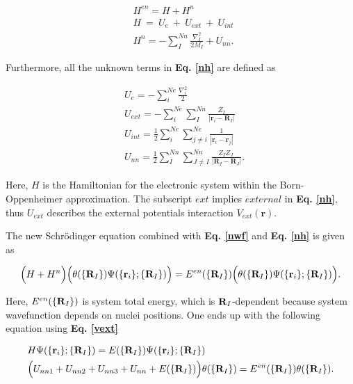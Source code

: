\documentclass[a4paper, 12pt, titlepage,oneside,drop]{kthesis}
\begin{document}
\begin{equation}\begin{split}\label{nh}
& {H^{en}} = H + H^n \\
& {H}\ = \ {U_e} \ + \ {U}_{ext} \ + \ {U}_{int}\  \\
& {H^n} = - \sum\limits_I^{Nn} \frac{{{\nabla}_{{I}}^{2}}}{2 M_{I}} + {{U}_{nn}}.
 \end{split}
\end{equation}

Furthermore, all the unknown terms in \textbf{Eq. \ref{nh}} are defined as

\begin{equation}\begin{split}\label{vext}
& {U_e} = - \sum\limits_i^{{Ne}}   \frac{{{\nabla}_{{i}}^{2}}}{2} \\
& U_{ext} = - \sum\limits_i^{{Ne}} \sum\limits_I^{{Nn}} \frac{Z_{I}}{|\textbf{r}_{i}-\textbf{R}_{I}|} \\
& {U}_{int} =  \frac{1}{2} \sum\limits_i^{{Ne}} \sum\limits_{j \neq i}^{{Ne}} \frac{1}{ |\textbf{r}_{i}-\textbf{r}_{j}|} \\
& {{U}_{nn}} = \frac{1}{2} \sum\limits_I^{{Nn}} \sum\limits_{J \neq I}^{{Nn}} \frac{Z_{I} Z_{J}\ }{|\textbf{R}_{I}-\textbf{R}_{J}|}.
\end{split}
\end{equation}

Here, $H$ is the Hamiltonian for the electronic system within the Born-Oppenheimer approximation. The subscript $ext$ implies $external$ in \textbf{Eq. \ref{nh}}, thus $U_{ext}$ describes
the external potentials interaction $V_{ext}({\textbf{r}})$. 

The new Schrödinger equation combined with \textbf{Eq. \ref{nwf}} and \textbf{Eq. \ref{nh}} is given as

\begin{equation}
 \Big( H+ {H}^n \Big) \Big({\theta(\{{\textbf R}_{I}\})} {\Psi(\{\textbf{r}_{i}\}; \{{\textbf R}_{I}\})} \Big) =
 E^{en}(\{{\textbf R_I}\}) \Big({\theta(\{{\textbf R}_{I}\})} {\Psi(\{\textbf{r}_{i}\}; \{{\textbf R}_{I}\})}\Big).
\end{equation}
 
\noindent Here, $E^{en}(\{{\textbf R }_I\})$ is system total energy, which is ${\textbf R}_I$-dependent because system wavefunction depends on nuclei positions. One ends up with the following equation using \textbf{Eq. \ref{vext}}

\begin{equation}\begin{split}\label{ise}
& {H} {\Psi(\{\textbf{r}_{ i}\}; \{{\textbf R}_{ I}\})} = E{(\{\textbf{R}_{ I}\})} {\Psi(\{\textbf{r}_{i}\}; \{{\textbf R}_{I}\})} \\
& \Big( {U}_{nn1}+{U}_{nn2}+{U}_{nn3}+{U}_{nn}+E(\{{\textbf R}_{I}\}) \Big) {\theta(\{\textbf{R}_{I}\})} = E^{en}(\{{\textbf R}_I\}) {\theta(\{\textbf{R}_{I}\})}.
\end{split}
\end{equation}
\end{document}
